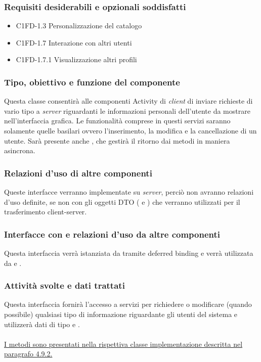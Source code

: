 \subsubsection*{Requisiti desiderabili e opzionali soddisfatti}
\begin{itemize}
    \item C1FD-1.3 Personalizzazione del catalogo
    \item C1FD-1.7 Interazione con altri utenti
    \item C1FD-1.7.1 Visualizzazione altri profili
\end{itemize}
\subsubsection*{Tipo, obiettivo e funzione del componente}
Questa classe consentir\`a alle componenti Activity di \emph{client} di inviare
richieste di vario tipo a \emph{server} riguardanti le informazioni personali
dell'utente da mostrare nell'interfaccia grafica. Le funzionalit\`a comprese in
questi servizi saranno solamente quelle basilari ovvero l'inserimento, la
modifica e la cancellazione di un utente. Sar\`a presente
anche , che gestir\`a il ritorno dai metodi in maniera
asincrona. 
\subsubsection*{Relazioni d'uso di altre componenti} Queste interfacce verranno
implementate su \emph{server}, perci\`o non avranno relazioni d'uso definite, se
non con gli oggetti DTO ( e ) che verranno
utilizzati per il trasferimento client-server. 
\subsubsection*{Interfacce con e relazioni d'uso da altre componenti}
Questa interfaccia verr\`a istanziata da  tramite deferred
binding e verr\`a utilizzata da  e .
\subsubsection*{Attivit\`a svolte e dati trattati}
Questa interfaccia fornir\`a l'accesso a servizi per richiedere o
modificare (quando possibile) qualsiasi tipo di informazione riguardante gli
utenti del sistema e utilizzer\`a dati di tipo 
e .\\\\
\underline{I metodi sono presentati nella rispettiva classe implementazione
descritta nel paragrafo 4.9.2.}


